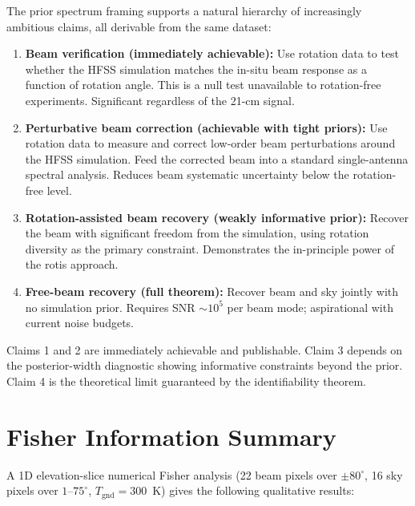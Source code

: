 \documentclass{aastex631}
\newcommand{\Tgnd}{T_\mathrm{gnd}}
\theoremstyle{plain}
\theoremstyle{remark}
\begin{document}
The prior spectrum framing supports a natural hierarchy of
increasingly ambitious claims, all derivable from the same dataset:

\begin{enumerate}
  \item \textbf{Beam verification (immediately achievable):}
    Use rotation data to test whether the HFSS simulation matches
    the in-situ beam response as a function of rotation angle.
    This is a null test unavailable to rotation-free experiments.
    Significant regardless of the 21-cm signal.

  \item \textbf{Perturbative beam correction (achievable with
    tight priors):}
    Use rotation data to measure and correct low-order beam
    perturbations around the HFSS simulation.
    Feed the corrected beam into a standard single-antenna spectral
    analysis.
    Reduces beam systematic uncertainty below the rotation-free level.

  \item \textbf{Rotation-assisted beam recovery (weakly informative
    prior):}
    Recover the beam with significant freedom from the simulation,
    using rotation diversity as the primary constraint.
    Demonstrates the in-principle power of the rotis approach.

  \item \textbf{Free-beam recovery (full theorem):}
    Recover beam and sky jointly with no simulation prior.
    Requires SNR $\sim 10^5$ per beam mode; aspirational with
    current noise budgets.
\end{enumerate}

Claims 1 and 2 are immediately achievable and publishable.
Claim 3 depends on the posterior-width diagnostic showing
informative constraints beyond the prior.
Claim 4 is the theoretical limit guaranteed by the identifiability
theorem.

\section{Fisher Information Summary} \label{sec:fisher}

A 1D elevation-slice numerical Fisher analysis (22 beam pixels over
$\pm 80^\circ$, 16 sky pixels over $1$--$75^\circ$, $\Tgnd = 300$~K)
gives the following qualitative results:
\end{document}
